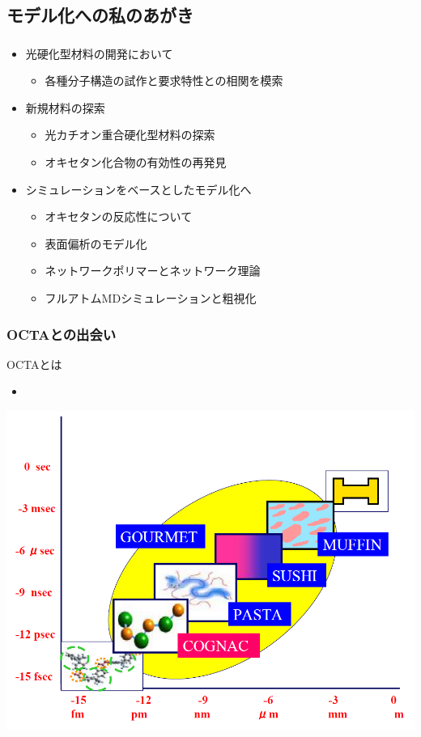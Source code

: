 \documentclass[12pt, dvipdfmx]{beamer}
\begin{document}
\subsection{モデル化への私のあがき}
\begin{frame}
    \frametitle{}
        \begin{itemize}
            \item 光硬化型材料の開発において
            \begin{itemize}
                \item 各種分子構造の試作と要求特性との相関を模索
            \end{itemize}
            \item 新規材料の探索
            \begin{itemize}
                \item 光カチオン重合硬化型材料の探索
                \item オキセタン化合物の有効性の再発見
            \end{itemize}
            \item シミュレーションをベースとしたモデル化へ
            \begin{itemize}
                \item オキセタンの反応性について
                \item 表面偏析のモデル化
                \item ネットワークポリマーとネットワーク理論
                \item フルアトムMDシミュレーションと粗視化
            \end{itemize}
        \end{itemize}
\end{frame}

\begin{frame}
    \frametitle{OCTAとの出会い}
        \begin{block}{OCTAとは}
            \begin{itemize}
                \item 
            \end{itemize}
        \end{block}
        \centering
            \includegraphics[width=.8\textwidth]{octa.png}
\end{frame}
\end{document}
